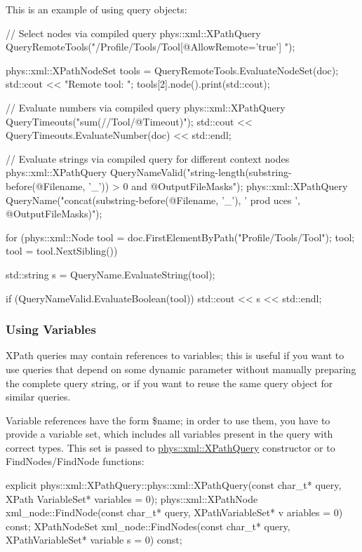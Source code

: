 This is an example of using query objects: 
\begin{DoxyCode}
 // Select nodes via compiled query
 phys::xml::XPathQuery QueryRemoteTools("/Profile/Tools/Tool[@AllowRemote='true']
      ");

 phys::xml::XPathNodeSet tools = QueryRemoteTools.EvaluateNodeSet(doc);
 std::cout << "Remote tool: ";
 tools[2].node().print(std::cout);

 // Evaluate numbers via compiled query
 phys::xml::XPathQuery QueryTimeouts("sum(//Tool/@Timeout)");
 std::cout << QueryTimeouts.EvaluateNumber(doc) << std::endl;

 // Evaluate strings via compiled query for different context nodes
 phys::xml::XPathQuery QueryNameValid("string-length(substring-before(@Filename, 
      '_')) > 0 and @OutputFileMasks");
 phys::xml::XPathQuery QueryName("concat(substring-before(@Filename, '_'), ' prod
      uces ', @OutputFileMasks)");

 for (phys::xml::Node tool = doc.FirstElementByPath("Profile/Tools/Tool"); tool; 
      tool = tool.NextSibling())
 {
     std::string s = QueryName.EvaluateString(tool);

     if (QueryNameValid.EvaluateBoolean(tool)) std::cout << s << std::endl;
 }
\end{DoxyCode}
 \hypertarget{XMLManual_XMLXPathVariables}{}\subsubsection{Using Variables}\label{XMLManual_XMLXPathVariables}
XPath queries may contain references to variables; this is useful if you want to use queries that depend on some dynamic parameter without manually preparing the complete query string, or if you want to reuse the same query object for similar queries. \par
 \par
 Variable references have the form \$name; in order to use them, you have to provide a variable set, which includes all variables present in the query with correct types. This set is passed to \hyperlink{classphys_1_1xml_1_1XPathQuery}{phys::xml::XPathQuery} constructor or to FindNodes/FindNode functions: 
\begin{DoxyCode}
 explicit phys::xml::XPathQuery::phys::xml::XPathQuery(const char_t* query, XPath
      VariableSet* variables = 0);
 phys::xml::XPathNode xml_node::FindNode(const char_t* query, XPathVariableSet* v
      ariables = 0) const;
 XPathNodeSet xml_node::FindNodes(const char_t* query, XPathVariableSet* variable
      s = 0) const;
\end{DoxyCode}
